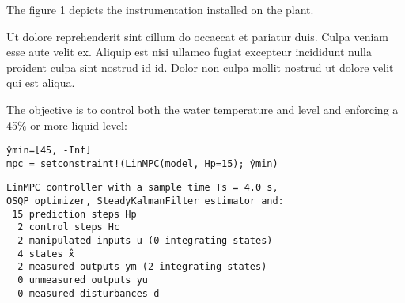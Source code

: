 The figure 1 depicts the instrumentation installed on the plant.

Ut dolore reprehenderit sint cillum do occaecat et pariatur duis. Culpa veniam esse aute velit ex. Aliquip est nisi ullamco fugiat excepteur incididunt nulla proident culpa sint nostrud id id. Dolor non culpa mollit nostrud ut dolore velit qui est aliqua.

The objective is to control both the water temperature and level and enforcing a 45\% or 
more liquid level:

\begin{verbatim}
ŷmin=[45, -Inf]
mpc = setconstraint!(LinMPC(model, Hp=15); ŷmin)
\end{verbatim}
\vspace{-25pt}
\begin{verbatim}
LinMPC controller with a sample time Ts = 4.0 s,
OSQP optimizer, SteadyKalmanFilter estimator and:
 15 prediction steps Hp
  2 control steps Hc
  2 manipulated inputs u (0 integrating states)
  4 states x̂
  2 measured outputs ym (2 integrating states)
  0 unmeasured outputs yu
  0 measured disturbances d
\end{verbatim}

